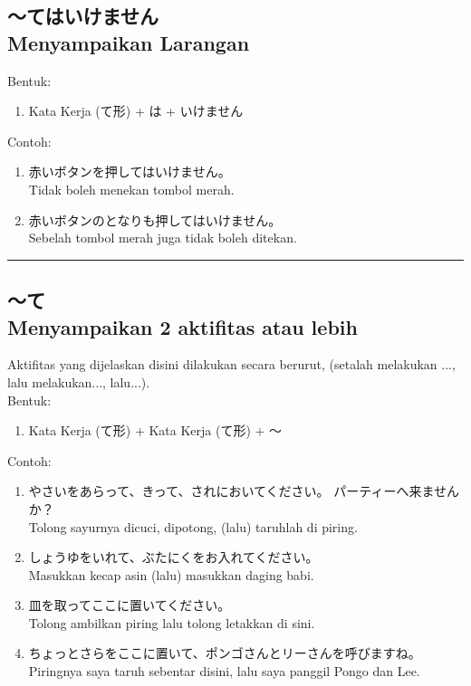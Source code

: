\subsection*{
    ～てはいけません \\
    Menyampaikan Larangan
}
Bentuk:
\begin{enumerate}
    \item Kata Kerja (て形) + は + いけません
\end{enumerate}
Contoh: 
\begin{enumerate}
    \item 赤いボタンを押してはいけません。
    \\ Tidak boleh menekan tombol merah.
    \item 赤いボタンのとなりも押してはいけません。
    \\ Sebelah tombol merah juga tidak boleh ditekan.
\end{enumerate}

\vspace{0.2cm}\hrule height 1pt\vspace{0.2cm}

\newpage
\subsection*{
    ～て \\
    Menyampaikan 2 aktifitas atau lebih
}
Aktifitas yang dijelaskan disini dilakukan secara berurut, 
(setalah melakukan ..., lalu melakukan..., lalu...).\\
Bentuk:
\begin{enumerate}
    \item Kata Kerja (て形) + Kata Kerja (て形) + ～
\end{enumerate}
Contoh: 
\begin{enumerate}
    \item やさいをあらって、きって、されにおいてください。
    パーティーへ来ませんか？
    \\ Tolong sayurnya dicuci, dipotong, (lalu) taruhlah di piring.
    \item しょうゆをいれて、ぶたにくをお入れてください。
    \\ Masukkan kecap asin (lalu) masukkan daging babi.
    \item 皿を取ってここに置いてください。
    \\ Tolong ambilkan piring lalu tolong letakkan di sini.
    \item ちょっとさらをここに置いて、ポンゴさんとリーさんを呼びますね。
    \\ Piringnya saya taruh sebentar disini, lalu saya panggil Pongo dan Lee.
\end{enumerate}

